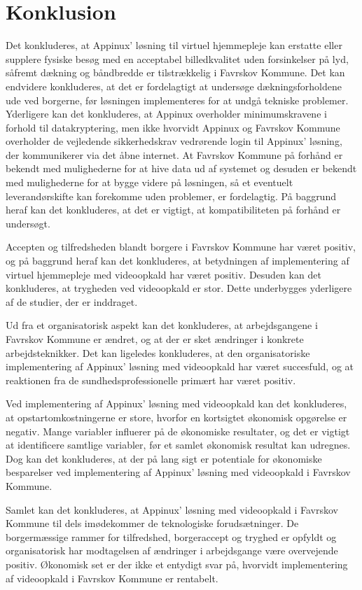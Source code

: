 \chapter{Konklusion}

Det konkluderes, at Appinux’ løsning til virtuel hjemmepleje kan erstatte eller supplere fysiske besøg med en acceptabel billedkvalitet uden forsinkelser på lyd, såfremt dækning og båndbredde er tilstrækkelig i Favrskov Kommune. Det kan endvidere konkluderes, at det er fordelagtigt at undersøge dækningsforholdene ude ved borgerne, før løsningen implementeres for at undgå tekniske problemer.
Yderligere kan det konkluderes, at Appinux overholder minimumskravene i forhold til datakryptering, men ikke hvorvidt Appinux og Favrskov Kommune overholder de vejledende sikkerhedskrav vedrørende login til Appinux' løsning, der kommunikerer via det åbne internet. 
At Favrskov Kommune på forhånd er bekendt med mulighederne for at hive data ud af systemet og desuden er bekendt med mulighederne for at bygge videre på løsningen, så et eventuelt leverandørskifte kan forekomme uden problemer, er fordelagtig. På baggrund heraf kan det konkluderes, at det er vigtigt, at kompatibiliteten på forhånd er undersøgt.

Accepten og tilfredsheden blandt borgere i Favrskov Kommune har været positiv, og på baggrund heraf kan det konkluderes, at betydningen af implementering af virtuel hjemmepleje med videoopkald har været positiv. Desuden kan det konkluderes, at trygheden ved videoopkald er stor. Dette underbygges yderligere af de studier, der er inddraget.

Ud fra et organisatorisk aspekt kan det konkluderes, at arbejdsgangene i Favrskov Kommune er ændret, og at der er sket ændringer i konkrete arbejdsteknikker. 
Det kan ligeledes konkluderes, at den organisatoriske implementering af Appinux' løsning med videoopkald har været succesfuld, og at reaktionen fra de sundhedsprofessionelle primært har været positiv. 

Ved implementering af Appinux' løsning med videoopkald kan det konkluderes, at opstartomkostningerne er store, hvorfor en kortsigtet økonomisk opgørelse er negativ.
Mange variabler influerer på de økonomiske resultater, og det er vigtigt at identificere samtlige variabler, før et samlet økonomisk resultat kan udregnes. Dog kan det konkluderes, at der på lang sigt er potentiale for økonomiske besparelser ved implementering af Appinux' løsning med videoopkald i Favrskov Kommune.  

Samlet kan det konkluderes, at Appinux’ løsning med videoopkald i Favrskov Kommune til dels imødekommer de teknologiske forudsætninger. De borgermæssige rammer for tilfredshed, borgeraccept og tryghed er opfyldt og organisatorisk har modtagelsen af ændringer i arbejdsgange være overvejende positiv. Økonomisk set er der ikke et entydigt svar på, hvorvidt implementering af videoopkald i Favrskov Kommune er rentabelt.






